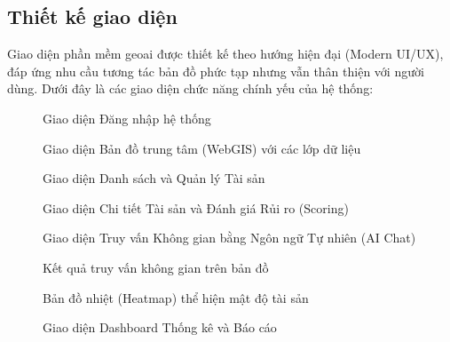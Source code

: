 \subsection{Thiết kế giao diện}
Giao diện phần mềm \gls{geoai} được thiết kế theo hướng hiện đại (Modern UI/UX), đáp ứng nhu cầu tương tác bản đồ phức tạp nhưng vẫn thân thiện với người dùng. Dưới đây là các giao diện chức năng chính yếu của hệ thống:

\begin{figure}[htbp]
    \centering
    \caption{Giao diện Đăng nhập hệ thống}
    \label{fig:ui_login}
\end{figure}

\begin{figure}[htbp]
    \centering
    \caption{Giao diện Bản đồ trung tâm (WebGIS) với các lớp dữ liệu}
    \label{fig:ui_map}
\end{figure}

\begin{figure}[htbp]
    \centering
    \caption{Giao diện Danh sách và Quản lý Tài sản}
    \label{fig:ui_asset_list}
\end{figure}

\begin{figure}[htbp]
    \centering
    \caption{Giao diện Chi tiết Tài sản và Đánh giá Rủi ro (Scoring)}
    \label{fig:ui_asset_detail}
\end{figure}

\begin{figure}[htbp]
    \centering
    \caption{Giao diện Truy vấn Không gian bằng Ngôn ngữ Tự nhiên (AI Chat)}
    \label{fig:ui_ai_chat}
\end{figure}

\begin{figure}[htbp]
    \centering
    \caption{Kết quả truy vấn không gian trên bản đồ}
    \label{fig:ui_ai_chat_2}
\end{figure}

\begin{figure}[htbp]
    \centering
    \caption{Bản đồ nhiệt (Heatmap) thể hiện mật độ tài sản}
    \label{fig:ui_heatmap}
\end{figure}

\begin{figure}[htbp]
    \centering
    \caption{Giao diện Dashboard Thống kê và Báo cáo}
    \label{fig:ui_dashboard}
\end{figure}

\cleardoublepage
